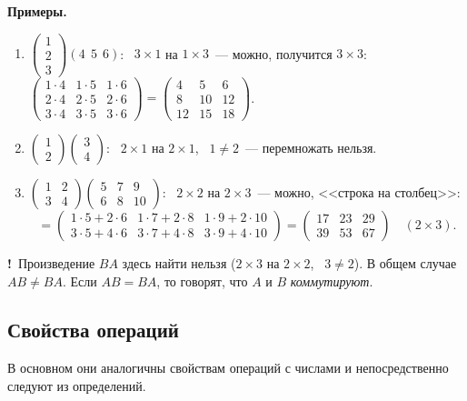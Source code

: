 \documentclass[a4paper,11pt]{article}
\newcommand{\imp}{\textbf{\color{red!70!black}!}\ }
\begin{document}
\begin{enumerate}[label=\arabic*)]
\textbf{Примеры.}
\begin{enumerate}[label=\arabic*)]
\item $\begin{pmatrix}1\\2\\3\end{pmatrix}(4\ \ 5\ \ 6)$: \ $3\times1$ на $1\times3$~--- можно, получится $3\times3$:
$\begin{pmatrix}1\cdot4&1\cdot5&1\cdot6\\2\cdot4&2\cdot5&2\cdot6\\3\cdot4&3\cdot5&3\cdot6\end{pmatrix}
=\begin{pmatrix}4&5&6\\8&10&12\\12&15&18\end{pmatrix}$.
\item $\begin{pmatrix}1\\2\end{pmatrix}\begin{pmatrix}3\\4\end{pmatrix}$: \ $2\times1$ на $2\times1$, \ $1\ne2$~---
перемножать нельзя.
\item $\begin{pmatrix}1&2\\3&4\end{pmatrix}\begin{pmatrix}5&7&9\\6&8&10\end{pmatrix}$: \ $2\times2$ на $2\times3$~---
можно, <<строка на столбец>>:
\[
=\begin{pmatrix}1\cdot5+2\cdot6&1\cdot7+2\cdot8&1\cdot9+2\cdot10\\3\cdot5+4\cdot6&3\cdot7+4\cdot8&3\cdot9+4\cdot10\end{pmatrix}
=\begin{pmatrix}17&23&29\\39&53&67\end{pmatrix}\quad(2\times3).
\]
\end{enumerate}
\imp Произведение $BA$ здесь найти нельзя ($2\times3$ на $2\times2$, \ $3\ne2$). В общем случае
$AB\ne BA$. Если $AB=BA$, то говорят, что $A$ и $B$ \emph{коммутируют}.
\end{enumerate}

\subsection{Свойства операций}
В основном они аналогичны свойствам операций с числами и непосредственно следуют из определений.
\end{document}
